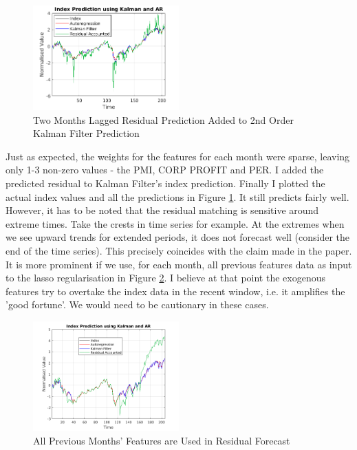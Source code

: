 \documentclass[11pt, fleqn]{article}
\begin{document}
\begin{figure}[!h]
    \centering
    \includegraphics[width=0.5\textwidth]{laglasso.png}
	\caption{Two Months Lagged Residual Prediction Added to 2nd Order Kalman Filter Prediction}
	\label{fig:laglasso}
\end{figure}

Just as expected, the weights for the features for each month were sparse, leaving only 1-3 non-zero values - the PMI, CORP PROFIT and PER. I added the predicted residual to Kalman Filter's index prediction. Finally I plotted the actual index values and all the predictions in Figure \ref{fig:laglasso}. It still predicts fairly well. However, it has to be noted that the residual matching is sensitive around extreme times. Take the crests in time series for example. At the extremes when we see upward trends for extended periods, it does not forecast well (consider the end of the time series). This precisely coincides with the claim made in the paper. It is more prominent if we use, for each month, all previous features data as input to the lasso regularisation in Figure \ref{fig:laglasso-all}. I believe at that point the exogenous features  try to overtake the index data in the recent window, i.e. it amplifies the 'good fortune'. We would need to be cautionary in these cases.

\begin{figure}[!h]
    \centering
    \includegraphics[width=0.5\textwidth]{laglasso_all.png}
	\caption{All Previous Months' Features are Used in Residual Forecast}
	\label{fig:laglasso-all}
\end{figure}
\end{document}
